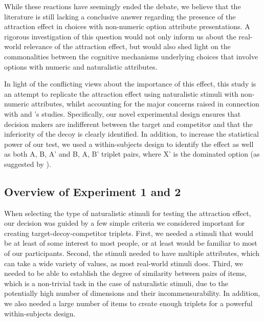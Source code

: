 \documentclass[11pt,a4paper]{article}
\begin{document}

While these reactions have seemingly ended the debate, we believe that the literature  is still lacking a conclusive answer regarding the presence of the attraction effect in choices with non-numeric option attribute presentations. A rigorous investigation of this question would not only inform us about the real-world relevance of the attraction effect, but would also shed light on the commonalities between the cognitive mechanisms underlying choices that involve options with numeric and naturalistic attributes.


In light of the conflicting views about the importance of this effect, this study is an attempt to replicate the attraction effect using naturalistic stimuli with non-numeric attributes, whilst accounting for the major concerns raised in connection with \citeauthor{Frederick2014} and \citeauthor{Yang2014}'s studies. Specifically, our novel experimental design ensures that decision makers are indifferent between the target and competitor and that the inferiority of the decoy is clearly identified. In addition, to increase the statistical power of our test, we used a within-subjects design to identify the effect as well as both A, B, A' and B, A, B' triplet pairs, where X' is the dominated option (as suggested by ). 

\subsection{Overview of Experiment 1 and 2}

When selecting the type of naturalistic stimuli for testing the attraction effect, our decision was guided by a few simple criteria we considered important for creating target-decoy-competitor triplets. First, we needed a stimuli that would be at least of some interest to most people, or at least would be familiar to most of our participants. Second, the stimuli needed to have multiple attributes, which can take a wide variety of values, as most real-world stimuli does. Third, we needed to be able to establish the degree of similarity between pairs of items, which is a non-trivial task in the case of naturalistic stimuli, due to the potentially high number of dimensions and their incommensurability. In addition, we also needed a large number of items to create enough triplets for a powerful within-subjects design. 
\end{document}
